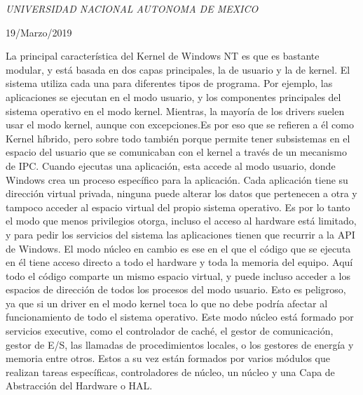 \documentclass[a4paper, 11pt, oneside]{article}
\begin{document}
\begin{titlepage}
	\textit{UNIVERSIDAD NACIONAL AUTONOMA DE MEXICO} 
	
	\vfill
	
	
	
	
	\vspace{0.3\baselineskip} 
	
	19/Marzo/2019 
	
	 

\end{titlepage}
La principal característica del Kernel de Windows NT es que es bastante modular, y está basada en dos capas principales, la de usuario y la de kernel. El sistema utiliza cada una para diferentes tipos de programa. Por ejemplo, las aplicaciones se ejecutan en el modo usuario, y los componentes principales del sistema operativo en el modo kernel. Mientras, la mayoría de los drivers suelen usar el modo kernel, aunque con excepciones.Es por eso que se refieren a él como Kernel híbrido, pero sobre todo también porque permite tener subsistemas en el espacio del usuario que se comunicaban con el kernel a través de un mecanismo de IPC. Cuando ejecutas una aplicación, esta accede al modo usuario, donde Windows crea un proceso específico para la aplicación. Cada aplicación tiene su dirección virtual privada, ninguna puede alterar los datos que pertenecen a otra y tampoco acceder al espacio virtual del propio sistema operativo. Es por lo tanto el modo que menos privilegios otorga, incluso el acceso al hardware está limitado, y para pedir los servicios del sistema las aplicaciones tienen que recurrir a la API de Windows. El modo núcleo en cambio es ese en el que el código que se ejecuta en él tiene acceso directo a todo el hardware y toda la memoria del equipo. Aquí todo el código comparte un mismo espacio virtual, y puede incluso acceder a los espacios de dirección de todos los procesos del modo usuario. Esto es peligroso, ya que si un driver en el modo kernel toca lo que no debe podría afectar al funcionamiento de todo el sistema operativo. Este modo núcleo está formado por servicios executive, como el controlador de caché, el gestor de comunicación, gestor de E/S, las llamadas de procedimientos locales, o los gestores de energía y memoria entre otros. Estos a su vez están formados por varios módulos que realizan tareas específicas, controladores de núcleo, un núcleo y una Capa de Abstracción del Hardware o HAL.
\end{document}
